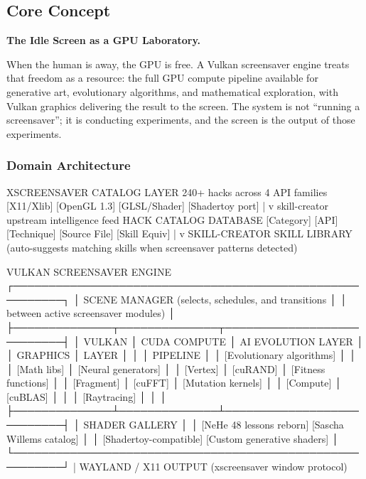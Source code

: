 \documentclass[11pt,letterpaper]{article}
\begin{document}
\subsection{Core Concept}

\textbf{The Idle Screen as a GPU Laboratory.}

When the human is away, the GPU is free. A Vulkan screensaver engine treats that freedom as a resource: the full GPU compute pipeline available for generative art, evolutionary algorithms, and mathematical exploration, with Vulkan graphics delivering the result to the screen. The system is not ``running a screensaver''; it is conducting experiments, and the screen is the output of those experiments.

\subsubsection{Domain Architecture}

\begin{asciibox}
XSCREENSAVER CATALOG LAYER
  240+ hacks across 4 API families
  [X11/Xlib] [OpenGL 1.3] [GLSL/Shader] [Shadertoy port]
       |
       v skill-creator upstream intelligence feed
  HACK CATALOG DATABASE
  [Category] [API] [Technique] [Source File] [Skill Equiv]
       |
       v
  SKILL-CREATOR SKILL LIBRARY
  (auto-suggests matching skills when screensaver patterns detected)

VULKAN SCREENSAVER ENGINE
  ┌─────────────────────────────────────────────────────────┐
  │  SCENE MANAGER (selects, schedules, and transitions      │
  │  between active screensaver modules)                     │
  ├──────────────┬──────────────┬───────────────────────────┤
  │ VULKAN       │ CUDA COMPUTE │ AI EVOLUTION LAYER        │
  │ GRAPHICS     │ LAYER        │                           │
  │ PIPELINE     │              │ [Evolutionary algorithms] │
  │              │ [Math libs]  │ [Neural generators]       │
  │ [Vertex]     │ [cuRAND]     │ [Fitness functions]       │
  │ [Fragment]   │ [cuFFT]      │ [Mutation kernels]        │
  │ [Compute]    │ [cuBLAS]     │                           │
  │ [Raytracing] │              │                           │
  ├──────────────┴──────────────┴───────────────────────────┤
  │  SHADER GALLERY                                          │
  │  [NeHe 48 lessons reborn] [Sascha Willems catalog]      │
  │  [Shadertoy-compatible] [Custom generative shaders]     │
  └─────────────────────────────────────────────────────────┘
       |
  WAYLAND / X11 OUTPUT  (xscreensaver window protocol)
\end{asciibox}
\end{document}
